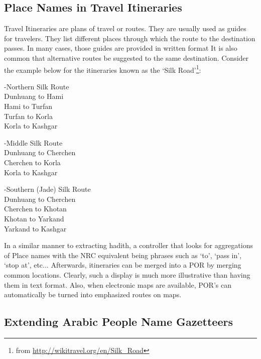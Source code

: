 \documentclass{llncs}
\begin{document}
\subsection{Place Names in Travel Itineraries}

Travel Itineraries are plans of travel or routes. They are usually used as guides for travelers. They list different
places through which the route to the destination passes. 
In many cases, those guides are provided in written format
It is also common that alternative routes be suggested to the same destination.
Consider the example below for the itineraries known as the `Silk Road'\footnote{from \url{http://wikitravel.org/en/Silk_Road}}:

{\setlength{\parindent}{20pt} 
\setlength{\parskip}{1ex}
\indent-Northern Silk Route \\
\indent \indent Dunhuang to Hami \\
\indent \indent Hami to Turfan \\ 
\indent \indent Turfan to Korla \\
\indent \indent Korla to Kashgar  

\indent -Middle Silk Route \\ 
\indent \indent Dunhuang to Cherchen \\
\indent \indent Cherchen to Korla \\
\indent \indent Korla to Kashgar 

\indent -Southern (Jade) Silk Route \\
\indent \indent Dunhuang to Cherchen \\
\indent \indent Cherchen to Khotan \\
\indent \indent Khotan to Yarkand \\
\indent \indent Yarkand to Kashgar \\ }


In a similar manner to extracting hadith, a controller that looks for aggregations of Place names
with the NRC equivalent being phrases such as `to', `pass in', `stop at', etc... 
Afterwards, itineraries can be merged into a POR by merging common locations.
Clearly, such a display is much more illustrative than having them in text format.
Also, when electronic maps are available, POR's can automatically be turned into emphasized routes on maps.

\subsection{Extending Arabic People Name Gazetteers}
\end{document}
